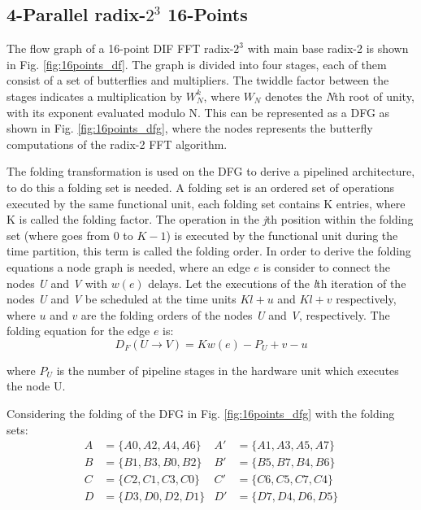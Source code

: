 \documentclass[10pt,times,mathptm,psfig,final,journal,comsoc]{IEEEtran}
\begin{document}
\subsection{4-Parallel radix-$2^3$ 16-Points}
The flow graph of a 16-point DIF FFT radix-$2^3$ with main base radix-2 is shown in Fig. \ref{fig:16points_df}. The graph is divided into four stages, each of them consist of a set of butterflies and multipliers. The twiddle factor between the stages indicates a multiplication by $W^k_N$, where $W_N$ denotes the \textit{N}th root of unity, with its exponent evaluated modulo N. This can be represented as a DFG as shown in Fig. \ref{fig:16points_dfg}, where the nodes represents the butterfly computations of the radix-2 FFT algorithm. 

The folding transformation is used on the DFG to derive a pipelined architecture, to do this a folding set is needed. A folding set is an ordered set of operations executed by the same functional unit, each folding set contains K entries, where K is called the folding factor. The operation in the \textit{j}th position within the folding set (where goes from $0$ to $K-1$) is executed by the functional unit during the time partition, this term is called the folding order.
In order to derive the folding equations a node graph is needed, where an edge $e$ is consider to connect the nodes \textit{U} and \textit{V} with $w(e)$ delays. Let the executions of the \textit{l}th iteration of the nodes \textit{U} and \textit{V} be scheduled at the time units $Kl+u$ and $Kl+v$ respectively, where $u$ and $v$ are the folding orders of the nodes \textit{U} and \textit{V}, respectively. The folding equation for the edge $e$ is:
\begin{equation}\label{eqn:fold_equation}
D_F(U \to V) = Kw(e)-P_U+v-u
\end{equation}

where $P_U$ is the number of pipeline stages in the hardware unit which executes the node U.

Considering the folding of the DFG in Fig. \ref{fig:16points_dfg} with the folding sets:
\begin{align*}%
A&= \{ A0,A2,A4,A6 \}  & A'&= \{ A1,A3,A5,A7 \} \\
B&=\{ B1,B3,B0,B2 \}   &B'&=\{ B5,B7,B4,B6 \} 	\\
C&=\{ C2,C1,C3,C0 \}   &C'&=\{ C6,C5,C7,C4 \} 	\\ 
D&=\{ D3,D0,D2,D1 \}   &D'&=\{ D7,D4,D6,D5 \}  
\end{align*}
\end{document}
